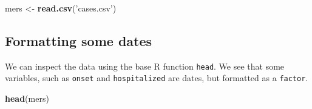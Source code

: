 \documentclass[]{article}
\newenvironment{Shaded}{\begin{snugshade}}{\end{snugshade}}
\newcommand{\KeywordTok}[1]{\textcolor[rgb]{0.13,0.29,0.53}{\textbf{#1}}}
\newcommand{\StringTok}[1]{\textcolor[rgb]{0.31,0.60,0.02}{#1}}
\newcommand{\NormalTok}[1]{#1}
\begin{document}
\begin{Shaded}
\begin{Highlighting}[]
\NormalTok{mers <-}\StringTok{ }\KeywordTok{read.csv}\NormalTok{(}\StringTok{'cases.csv'}\NormalTok{)}
\end{Highlighting}
\end{Shaded}

\hypertarget{formatting-some-dates}{%
\subsection{Formatting some dates}\label{formatting-some-dates}}

We can inspect the data using the base R function \texttt{head}. We see
that some variables, such as \texttt{onset} and \texttt{hospitalized}
are dates, but formatted as a \texttt{factor}.

\begin{Shaded}
\begin{Highlighting}[]
\KeywordTok{head}\NormalTok{(mers)}
\end{Highlighting}
\end{Shaded}
\end{document}
